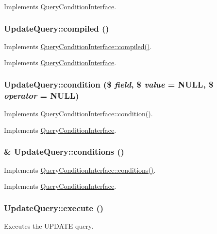 Implements \hyperlink{interfaceQueryConditionInterface_ad409672ac9ac50787eec52ecdf5a60b1}{QueryConditionInterface}.\hypertarget{classUpdateQuery_aa094828d0014df9d6893ddc61ea00852}{
\subsubsection[{compiled}]{\setlength{\rightskip}{0pt plus 5cm}UpdateQuery::compiled ()}}
\label{classUpdateQuery_aa094828d0014df9d6893ddc61ea00852}
Implements \hyperlink{interfaceQueryConditionInterface_a4aac3f4505275edecad9c22351e591cb}{QueryConditionInterface::compiled()}. 

Implements \hyperlink{interfaceQueryConditionInterface_a4aac3f4505275edecad9c22351e591cb}{QueryConditionInterface}.\hypertarget{classUpdateQuery_a850350cb972f539accbecf07daec23d2}{
\subsubsection[{condition}]{\setlength{\rightskip}{0pt plus 5cm}UpdateQuery::condition (\$ {\em field}, \/  \$ {\em value} = {\ttfamily NULL}, \/  \$ {\em operator} = {\ttfamily NULL})}}
\label{classUpdateQuery_a850350cb972f539accbecf07daec23d2}
Implements \hyperlink{interfaceQueryConditionInterface_aa6d9d96fa17441b5222d1ffddd4c1799}{QueryConditionInterface::condition()}. 

Implements \hyperlink{interfaceQueryConditionInterface_aa6d9d96fa17441b5222d1ffddd4c1799}{QueryConditionInterface}.\hypertarget{classUpdateQuery_a3c2a934f164d518ab4aeb5182e770a24}{
\subsubsection[{conditions}]{\setlength{\rightskip}{0pt plus 5cm}\& UpdateQuery::conditions ()}}
\label{classUpdateQuery_a3c2a934f164d518ab4aeb5182e770a24}
Implements \hyperlink{interfaceQueryConditionInterface_a894cc290ed61feb3693b1d459ae86888}{QueryConditionInterface::conditions()}. 

Implements \hyperlink{interfaceQueryConditionInterface_a894cc290ed61feb3693b1d459ae86888}{QueryConditionInterface}.\hypertarget{classUpdateQuery_a8a90104d1f7aa75cda332b569fd566b9}{
\subsubsection[{execute}]{\setlength{\rightskip}{0pt plus 5cm}UpdateQuery::execute ()}}
\label{classUpdateQuery_a8a90104d1f7aa75cda332b569fd566b9}
Executes the UPDATE query.

